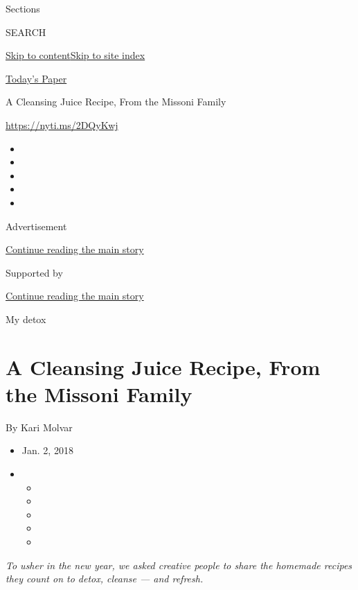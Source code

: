 Sections

SEARCH

\protect\hyperlink{site-content}{Skip to
content}\protect\hyperlink{site-index}{Skip to site index}

\href{https://myaccount.nytimes.com/auth/login?response_type=cookie\&client_id=vi}{}

\href{https://www.nytimes.com/section/todayspaper}{Today's Paper}

A Cleansing Juice Recipe, From the Missoni Family

\href{https://nyti.ms/2DQyKwj}{https://nyti.ms/2DQyKwj}

\begin{itemize}
\item
\item
\item
\item
\item
\end{itemize}

Advertisement

\protect\hyperlink{after-top}{Continue reading the main story}

Supported by

\protect\hyperlink{after-sponsor}{Continue reading the main story}

My detox

\hypertarget{a-cleansing-juice-recipe-from-the-missoni-family}{%
\section{A Cleansing Juice Recipe, From the Missoni
Family}\label{a-cleansing-juice-recipe-from-the-missoni-family}}

By Kari Molvar

\begin{itemize}
\item
  Jan. 2, 2018
\item
  \begin{itemize}
  \item
  \item
  \item
  \item
  \item
  \end{itemize}
\end{itemize}

\emph{To usher in the new year, we asked creative people to share the
homemade recipes they count on to detox, cleanse --- and refresh.}

